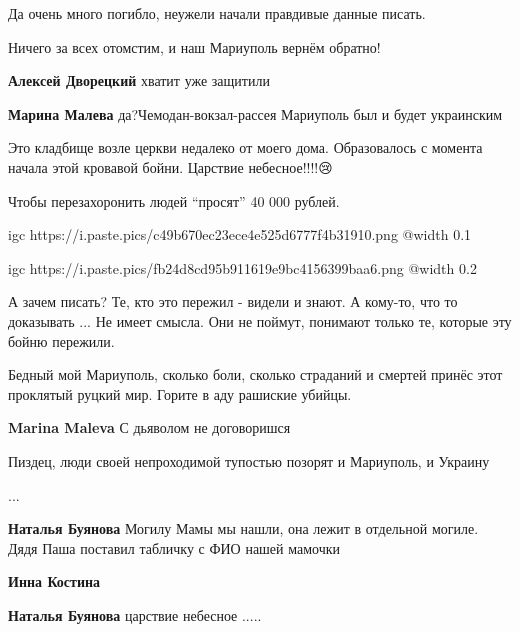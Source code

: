 
Да очень много погибло, неужели начали правдивые данные писать.


Ничего за всех отомстим, и наш Мариуполь вернём обратно!

\begin{itemize} %
\textbf{Алексей Дворецкий} хватит уже защитили🥲

\textbf{Марина Малева} да?Чемодан-вокзал-рассея
Мариуполь был и будет украинским
\end{itemize} %


Это кладбище возле церкви недалеко от моего дома. Образовалось с момента начала
этой кровавой бойни. Царствие небесное!!!!😢


Чтобы перезахоронить людей \enquote{просят} 40 000 рублей.


\ifcmt
  igc https://i.paste.pics/c49b670ec23ece4e525d6777f4b31910.png
	@width 0.1
\fi


\ifcmt
  igc https://i.paste.pics/fb24d8cd95b911619e9bc4156399baa6.png
	@width 0.2
\fi


А зачем писать? Те, кто это пережил - видели и знают. А кому-то, что то
доказывать ... Не имеет смысла. Они не поймут, понимают только те, которые эту
бойню пережили.


Бедный мой Мариуполь, сколько боли, сколько страданий и смертей принёс этот
проклятый руцкий мир. Горите в аду рашиские убийцы.

\begin{itemize} %
\textbf{Marina Maleva} С дьяволом не договоришся
\end{itemize} %


Пиздец, люди своей непроходимой тупостью позорят и Мариуполь, и Украину

...

\begin{itemize} %
\textbf{Наталья Буянова} Могилу Мамы мы нашли, она лежит в отдельной могиле. Дядя Паша поставил табличку с ФИО нашей мамочки

\textbf{Инна Костина} 🙏🙏🙏

\textbf{Наталья Буянова} царствие небесное .....
\end{itemize} %
